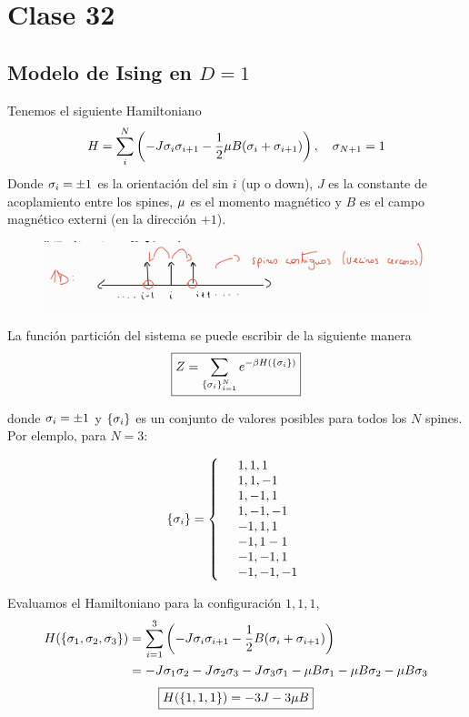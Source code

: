 \section{Clase 32}
\subsection{Modelo de Ising en $D=1$}
Tenemos el siguiente Hamiltoniano
\begin{equation}
  H=\sum_i^N\left(-J\sigma_i\sigma_{i+1}-\frac{1}{2}\mu B(\sigma_i+\sigma_{i+1})\right),\quad \sigma_{N+1}=1
\end{equation}
Donde $\sigma_i=\pm 1$ es la orientación del sin $i$ (up o down), $J$ es la constante de acoplamiento entre los spines, $\mu$ es el momento magnético y $B$ es el campo magnético externi (en la dirección $+1$).

\begin{figure}[h!]
	\centering
	\includegraphics[scale=0.4]{fig/ising}
\end{figure}

La función partición del sistema se puede escribir de la siguiente manera
\begin{equation}
 \boxed{ Z=\sum_{\{\sigma_i\}_{i=1}^N}e^{-\beta H\left(\{\sigma_i\}\right)}}
\end{equation}

donde $\sigma_i=\pm 1$ y $\{\sigma_i\}$ es un conjunto de valores posibles para todos los $N$ spines. Por elemplo, para $N=3$:

\begin{equation}
  \{\sigma_i \}=\left\{\begin{array}{ll}
  	&1,1,1\\
  	&1,1,-1\\
  	&1,-1,1\\
  	&1,-1,-1\\
  	&-1,1,1\\
  	&-1,1-1\\
  	&-1,-1,1\\
  	&-1,-1,-1
  \end{array}\right.
\end{equation}

Evaluamos el Hamiltoniano para la configuración $1,1,1$,
\begin{align}
  H(\{\sigma_1,\sigma_2,\sigma_3\})&=\sum_{i=1}^3\left(-J\sigma_i\sigma_{i+1}-\frac{1}{2}B(\sigma_i+\sigma_{i+1})\right)\\
  &=-J\sigma_1\sigma_2-J\sigma_2\sigma_3-J\sigma_3\sigma_1-\mu B\sigma_1-\mu B\sigma_2-\mu B\sigma_3
\end{align}
\begin{equation}
\boxed{  H(\{1,1,1\})=-3J-3\mu B}
\end{equation}

